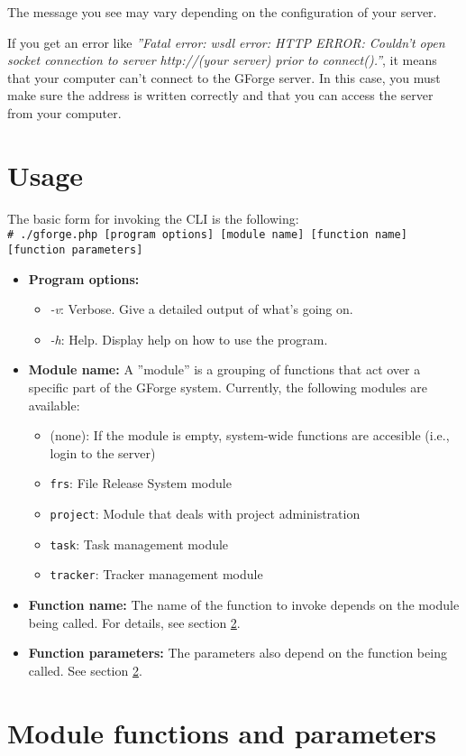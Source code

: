 \documentclass[a4]{article}
\newenvironment{parameterlist}{
\begin{itemize}
    }{
\end{itemize}
}
\newcommand{\parameter}[1]{\item \emph{#1}:}
\begin{document}
The message you see may vary depending on the configuration of your server.

If you get an error like \textit{''Fatal error: wsdl error: HTTP ERROR: Couldn't open socket connection to server http://(your server) prior to connect().''},
it means that your computer can't connect to the GForge server. In this case, you
must make sure the address is written correctly and that you can access the server from your computer.

\section{Usage}
The basic form for invoking the CLI is the following: \\
\verb|# ./gforge.php [program options] [module name] [function name] [function parameters]|

\begin{itemize}
    \item \textbf{Program options:}
    \begin{parameterlist}
\parameter{-v} Verbose. Give a detailed output of what's going on.
\parameter{-h} Help. Display help on how to use the program.
\end{parameterlist}
\item \textbf{Module name:} A ''module'' is a grouping of functions that act over a specific part of the GForge
system. Currently, the following modules are available:
\begin{itemize}
    \item (none): If the module is empty, system-wide functions are accesible (i.e., login to the server)
    \item \verb|frs|: File Release System module
    \item \verb|project|: Module that deals with project administration
    \item \verb|task|: Task management module
    \item \verb|tracker|: Tracker management module
\end{itemize}
\item \textbf{Function name:} The name of the function to invoke depends on the module being called. For details, see
section \ref{parametros}.
\item \textbf{Function parameters:} The parameters also depend on the function being called. See section \ref{parametros}.
\end{itemize}

\section{Module functions and parameters}\label{parametros}
\end{document}
